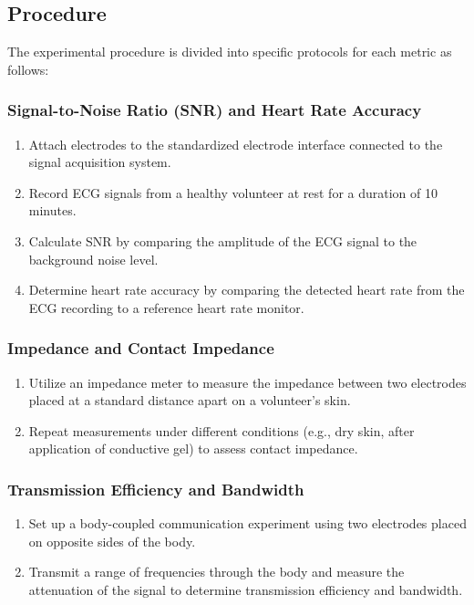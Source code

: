 \subsection{Procedure}
The experimental procedure is divided into specific protocols for each metric as follows:

\subsubsection{Signal-to-Noise Ratio (SNR) and Heart Rate Accuracy}
\begin{enumerate}
    \item Attach electrodes to the standardized electrode interface connected to the signal acquisition system.
    \item Record ECG signals from a healthy volunteer at rest for a duration of 10 minutes.
    \item Calculate SNR by comparing the amplitude of the ECG signal to the background noise level.
    \item Determine heart rate accuracy by comparing the detected heart rate from the ECG recording to a reference heart rate monitor.
\end{enumerate}

\subsubsection{Impedance and Contact Impedance}
\begin{enumerate}
    \item Utilize an impedance meter to measure the impedance between two electrodes placed at a standard distance apart on a volunteer's skin.
    \item Repeat measurements under different conditions (e.g., dry skin, after application of conductive gel) to assess contact impedance.
\end{enumerate}

\subsubsection{Transmission Efficiency and Bandwidth}
\begin{enumerate}
    \item Set up a body-coupled communication experiment using two electrodes placed on opposite sides of the body.
    \item Transmit a range of frequencies through the body and measure the attenuation of the signal to determine transmission efficiency and bandwidth.
\end{enumerate}

